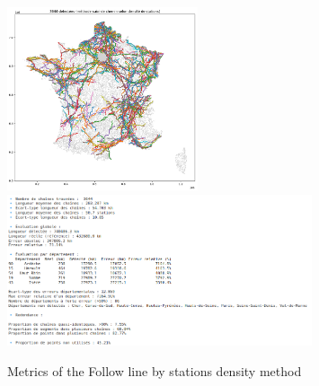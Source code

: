 \documentclass[main.tex]{subfiles}
\begin{document}
\begin{figure}[H]
    \includegraphics[width=0.5\textwidth]{Images/Res_Followline_Dens.png}
    \includegraphics[width=0.8\textwidth]{Images/Metrics_Followline_Dens.png}
    \caption{Metrics of the Follow line by stations density method}
\end{figure}
\end{document}

